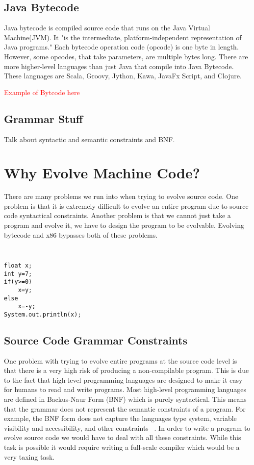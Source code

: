 \documentclass{sig-alternate}
\newcommand{\mycomment}[1]{\textcolor{red}{#1}}
\begin{document}
\subsection{Java Bytecode}
Java bytecode is compiled source code that runs on the Java Virtual Machine(JVM). It "is the intermediate, platform-independent representation of Java programs\cite{VIII:2011}." Each bytecode operation code (opcode) is one byte in length. However, some opcodes, that take parameters, are multiple bytes long\cite{JavaBytecode:2014}.
There are more higher-level languages than just Java that compile into Java Bytecode. These languages are Scala, Groovy, Jython, Kawa, JavaFx Script, and Clojure\cite{FINCH:2011}.

\mycomment{Example of Bytcode here}


\subsection{Grammar Stuff}
Talk about syntactic and semantic constraints and BNF.


\section{Why Evolve Machine Code?}

There are many problems we run into when trying to evolve source code. One problem is that it is extremely difficult to evolve an entire program due to source code syntactical constraints. Another problem is that we cannot just take a program and evolve it, we have to design the program to be evolvable. Evolving bytecode and x86 bypasses both of these problems.
{\tt
\begin{verbatim}
float x; 
int y=7;
if(y>=0)
    x=y;
else
    x=-y;
System.out.println(x);

\end{verbatim}
}

\subsection{Source Code Grammar Constraints}
One problem with trying to evolve entire programs at the source code level is that there is a very high risk of producing a non-compilable program. This is due to the fact that high-level programming languages are designed to make it easy for humans to read and write programs. Most high-level programming languages are defined in Backus-Naur Form (BNF) which is purely syntactical\cite{BNF:2014}\cite{FINCH:2011}. This means that the grammar does not represent the semantic constraints of a program. For example, the BNF form does not capture the languages type system, variable visibility and accessibility, and other constraints ~\cite{FINCH:2011}. In order to write a program to evolve source code we would have to deal with all these constraints. While this task is possible it would require writing a full-scale compiler which would be a very taxing task. \par
\end{document}
